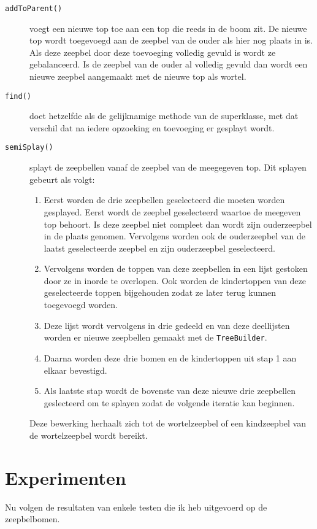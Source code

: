 \documentclass[12pt,hidelinks]{article}
\begin{document}
    \begin{description}
        \item[\tt addToParent()] voegt een nieuwe top toe aan een top die reeds in de boom zit.
            De nieuwe top wordt toegevoegd aan de zeepbel van de ouder als hier nog plaats in is. 
            Als deze zeepbel door deze toevoeging volledig gevuld is wordt ze gebalanceerd. 
            Is de zeepbel van de ouder al volledig gevuld dan wordt een nieuwe zeepbel aangemaakt met de nieuwe top als wortel.
        \item[\tt find()] doet hetzelfde als de gelijknamige methode van de superklasse, met dat verschil dat na iedere opzoeking en toevoeging er gesplayt wordt.
        \item[\tt semiSplay()] splayt de zeepbellen vanaf de zeepbel van de meegegeven top.
            Dit splayen gebeurt als volgt:
            \begin{enumerate}
                \item Eerst worden de drie zeepbellen geselecteerd die moeten worden gesplayed. Eerst wordt de zeepbel geselecteerd waartoe de meegeven top behoort.
                    Is deze zeepbel niet compleet dan wordt zijn ouderzeepbel in de plaats genomen.
                    Vervolgens worden ook de ouderzeepbel van de laatst geselecteerde zeepbel en zijn ouderzeepbel geselecteerd.
                \item Vervolgens worden de toppen van deze zeepbellen in een lijst gestoken door ze in inorde te overlopen.
                    Ook worden de kindertoppen van deze geselecteerde toppen bijgehouden zodat ze later terug kunnen toegevoegd worden.
                \item Deze lijst wordt vervolgens in drie gedeeld en van deze deellijsten worden er nieuwe zeepbellen gemaakt met de {\tt TreeBuilder}.
                \item Daarna worden deze drie bomen en de kindertoppen uit stap 1 aan elkaar bevestigd.
                \item Als laatste stap wordt de bovenste van deze nieuwe drie zeepbellen geslecteerd om te splayen zodat de volgende iteratie kan beginnen.
            \end{enumerate}
            Deze bewerking herhaalt zich tot de wortelzeepbel of een kindzeepbel van de wortelzeepbel wordt bereikt.
            
    \end{description}
    \newpage
    \part{Experimenten}
    Nu volgen de resultaten van enkele testen die ik heb uitgevoerd op de zeepbelbomen.
\end{document}
